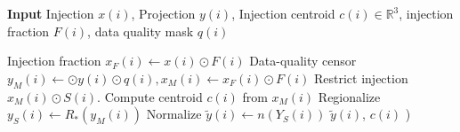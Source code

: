 \begin{algorithm}[H]
\begin{algorithmic}
\caption{{\bf Input} Injection $x(i)$, Projection $y(i)$, Injection centroid $c(i) \in \mathbb R^3$, injection fraction $F(i)$, data quality mask $q(i)$}
\State Injection fraction $x_F(i) \gets x(i) \odot F(i)$
\State Data-quality censor $y_M (i) \gets  \odot y(i) \odot q(i) , x_M(i) \gets x_F(i) \odot F(i)$
\State Restrict injection $x_M(i)  \odot S(i)$.
\State Compute centroid $c(i)$ from $x_M(i) $
\State Regionalize $y_S (i) \gets R_*(  y_M(i))$
\State Normalize $\tilde y(i) \gets n(Y_S(i))$
 $\tilde y(i)$, $c(i)$ )  %
\end{algorithmic}
\label{alg:preprocess}
\end{algorithm}


